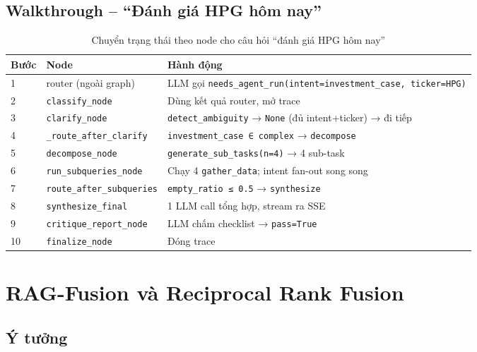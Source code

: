 \documentclass[12pt, a4paper]{report}
\begin{document}
\section{Walkthrough -- ``Đánh giá HPG hôm nay''}

\begin{table}[H]
\centering
\caption{Chuyển trạng thái theo node cho câu hỏi ``đánh giá HPG hôm nay''}
\small
\begin{tabularx}{\textwidth}{llX}
\toprule
\textbf{Bước} & \textbf{Node} & \textbf{Hành động} \\
\midrule
1 & router (ngoài graph) & LLM gọi \texttt{needs\_agent\_run(intent=investment\_case, ticker=HPG)} \\
\rowcolor{rowgray}
2 & \texttt{classify\_node} & Dùng kết quả router, mở trace \\
3 & \texttt{clarify\_node} & \texttt{detect\_ambiguity} → \texttt{None} (đủ intent+ticker) → đi tiếp \\
\rowcolor{rowgray}
4 & \texttt{\_route\_after\_clarify} & \texttt{investment\_case ∈ complex} → \texttt{decompose} \\
5 & \texttt{decompose\_node} & \texttt{generate\_sub\_tasks(n=4)} → 4 sub-task \\
\rowcolor{rowgray}
6 & \texttt{run\_subqueries\_node} & Chạy 4 \texttt{gather\_data}; intent fan-out song song \\
7 & \texttt{route\_after\_subqueries} & \texttt{empty\_ratio ≤ 0.5} → \texttt{synthesize} \\
\rowcolor{rowgray}
8 & \texttt{synthesize\_final} & 1 LLM call tổng hợp, stream ra SSE \\
9 & \texttt{critique\_report\_node} & LLM chấm checklist → \texttt{pass=True} \\
\rowcolor{rowgray}
10 & \texttt{finalize\_node} & Đóng trace \\
\bottomrule
\end{tabularx}
\end{table}

\newpage

\chapter{RAG-Fusion và Reciprocal Rank Fusion}

\section{Ý tưởng}
\end{document}
